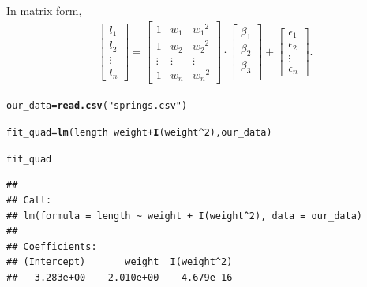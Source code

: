 \documentclass[11pt, a4paper]{article}\usepackage[]{graphicx}\usepackage[]{xcolor}
\makeatletter
\newcommand{\hlnum}[1]{\textcolor[rgb]{0.686,0.059,0.569}{#1}}%
\newcommand{\hlstr}[1]{\textcolor[rgb]{0.192,0.494,0.8}{#1}}%
\newcommand{\hlopt}[1]{\textcolor[rgb]{0,0,0}{#1}}%
\newcommand{\hlstd}[1]{\textcolor[rgb]{0.345,0.345,0.345}{#1}}%
\newcommand{\hlkwb}[1]{\textcolor[rgb]{0.69,0.353,0.396}{#1}}%
\newcommand{\hlkwd}[1]{\textcolor[rgb]{0.737,0.353,0.396}{\textbf{#1}}}%
\newenvironment{kframe}{%
 \def\at@end@of@kframe{}%
 \ifinner\ifhmode%
  \def\at@end@of@kframe{\end{minipage}}%
  \begin{minipage}{\columnwidth}%
 \fi\fi%
 \def\FrameCommand##1{\hskip\@totalleftmargin \hskip-\fboxsep
 \colorbox{shadecolor}{##1}\hskip-\fboxsep
     \hskip-\linewidth \hskip-\@totalleftmargin \hskip\columnwidth}%
 \MakeFramed {\advance\hsize-\width
   \@totalleftmargin\z@ \linewidth\hsize
   \@setminipage}}%
 {\par\unskip\endMakeFramed%
 \at@end@of@kframe}
\newenvironment{knitrout}{}{} %
\makeatother
\begin{document}
In matrix form, 
\begin{gather}
	\begin{bmatrix} l_1 \\	l_2 \\	\vdots \\	l_n	\end{bmatrix}
	=
	\begin{bmatrix}	1 & w_1 & {w_1}^2 \\	1 & w_2 & {w_2}^2 \\	\vdots & \vdots & \vdots \\	1 & w_n	& {w_n}^2 \end{bmatrix} 
	\cdot
	\begin{bmatrix}	\beta_1 \\	\beta_2 \\	\beta_3 \\ \end{bmatrix}  
	+	
	\begin{bmatrix}  \epsilon_1 \\	\epsilon_2 \\	\vdots \\	\epsilon_n	\end{bmatrix}.
\end{gather}

\begin{knitrout}
\color{fgcolor}\begin{kframe}
\begin{alltt}
\hlstd{our_data} \hlkwb{=} \hlkwd{read.csv}\hlstd{(}\hlstr{"springs.csv"}\hlstd{)}
\end{alltt}
\end{kframe}
\end{knitrout}

\begin{knitrout}
\color{fgcolor}\begin{kframe}
\begin{alltt}
\hlstd{fit_quad} \hlkwb{=} \hlkwd{lm}\hlstd{(length} \hlopt{~} \hlstd{weight} \hlopt{+} \hlkwd{I}\hlstd{(weight}\hlopt{^}\hlnum{2}\hlstd{), our_data)}
\end{alltt}
\end{kframe}
\end{knitrout}

\begin{knitrout}
\color{fgcolor}\begin{kframe}
\begin{alltt}
\hlstd{fit_quad}
\end{alltt}
\begin{verbatim}
## 
## Call:
## lm(formula = length ~ weight + I(weight^2), data = our_data)
## 
## Coefficients:
## (Intercept)       weight  I(weight^2)  
##   3.283e+00    2.010e+00    4.679e-16
\end{verbatim}
\end{kframe}
\end{knitrout}
\end{document}
